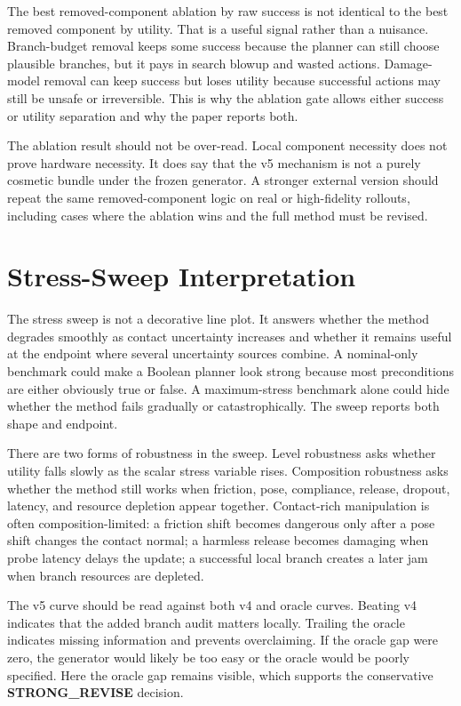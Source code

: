 \documentclass{article}
\newcommand{\terminal}{\textbf{STRONG\_REVISE}}
\begin{document}
The best removed-component ablation by raw success is not identical to the best removed component by utility. That is a useful signal rather than a nuisance. Branch-budget removal keeps some success because the planner can still choose plausible branches, but it pays in search blowup and wasted actions. Damage-model removal can keep success but loses utility because successful actions may still be unsafe or irreversible. This is why the ablation gate allows either success or utility separation and why the paper reports both.

The ablation result should not be over-read. Local component necessity does not prove hardware necessity. It does say that the v5 mechanism is not a purely cosmetic bundle under the frozen generator. A stronger external version should repeat the same removed-component logic on real or high-fidelity rollouts, including cases where the ablation wins and the full method must be revised.

\clearpage
\section{Stress-Sweep Interpretation}
The stress sweep is not a decorative line plot. It answers whether the method degrades smoothly as contact uncertainty increases and whether it remains useful at the endpoint where several uncertainty sources combine. A nominal-only benchmark could make a Boolean planner look strong because most preconditions are either obviously true or false. A maximum-stress benchmark alone could hide whether the method fails gradually or catastrophically. The sweep reports both shape and endpoint.

There are two forms of robustness in the sweep. Level robustness asks whether utility falls slowly as the scalar stress variable rises. Composition robustness asks whether the method still works when friction, pose, compliance, release, dropout, latency, and resource depletion appear together. Contact-rich manipulation is often composition-limited: a friction shift becomes dangerous only after a pose shift changes the contact normal; a harmless release becomes damaging when probe latency delays the update; a successful local branch creates a later jam when branch resources are depleted.

The v5 curve should be read against both v4 and oracle curves. Beating v4 indicates that the added branch audit matters locally. Trailing the oracle indicates missing information and prevents overclaiming. If the oracle gap were zero, the generator would likely be too easy or the oracle would be poorly specified. Here the oracle gap remains visible, which supports the conservative \terminal{} decision.
\end{document}
